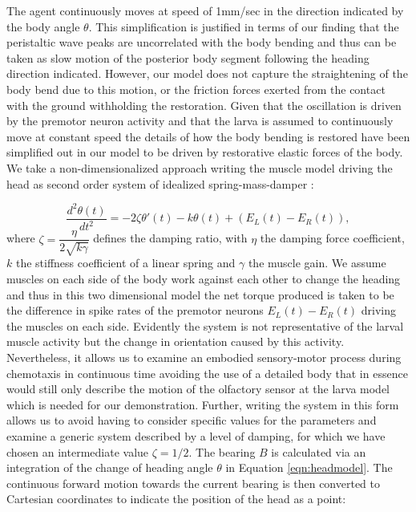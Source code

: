 \documentclass[11pt,a4paper]{article}
\begin{document}
The agent continuously moves at speed of 1mm/sec in the direction indicated by the body angle $\theta$. This simplification is justified in terms of our finding that the peristaltic wave peaks are uncorrelated with the body bending and thus can be taken as slow motion of the posterior body segment following the heading direction indicated. However, our model does not capture the straightening of the body bend due to this motion, or the friction forces exerted from the contact with the ground withholding the restoration. Given that the oscillation is driven by the premotor neuron activity and that the larva is assumed to continuously move at constant speed the details of how the body bending is restored have been simplified out in our model to be driven by restorative elastic forces of the body. 
 We take a non-dimensionalized approach writing the muscle model driving the head as second order system of idealized spring-mass-damper \cite[see][]{fung2013biomechanics}:
 
\begin{equation}
\label{eqn:headmodel}
\frac{d^2\theta(t)}{dt^2} = - 2 \zeta \theta'(t) - k \theta(t) + (E_L(t) - E_R(t)),
\end{equation}
where $\zeta= \dfrac{\eta}{ 2\sqrt{k \gamma}}$ defines the damping ratio, with $\eta$ the damping force coefficient, $k$ the stiffness coefficient of a linear spring and $\gamma$ the muscle gain.
We assume muscles on each side of the body work against each other to change the heading and thus in this two dimensional model the net torque produced is taken to be the difference in spike rates of the premotor neurons $E_L(t) - E_R(t)$ driving the muscles on each side. 
Evidently the system is not representative of the larval muscle activity but the change in orientation caused by this activity.
 Nevertheless, it allows us to examine an embodied sensory-motor process during chemotaxis in continuous time avoiding the use of a detailed body that in essence would still only describe the motion of the olfactory sensor at the larva model which is needed for our demonstration.
 Further, writing the system in this form allows us to avoid having to consider specific values for the parameters and examine a generic system described by a level of damping, for which we have chosen an intermediate value $\zeta=1/2$.
The bearing $B$ is calculated via an integration of the change of heading angle $\theta$ in Equation \ref{eqn:headmodel}. The continuous forward motion towards the current bearing is then converted to Cartesian coordinates to indicate the position of the head as a point:
\end{document}
